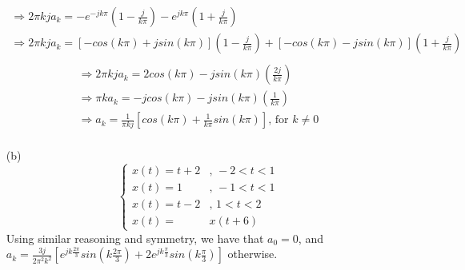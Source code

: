 \documentclass{article}
\begin{document}
\begin{enumerate}
\begin{equation*}
\begin{array}{l}
                    \Rightarrow 2\pi kja_{k} = -e^{-jk\pi}(1-\frac{j}{k\pi})-e^{jk\pi}(1+\frac{j}{k\pi}) \\
                    \Rightarrow 2\pi kja_{k} = [-cos(k\pi)+jsin(k\pi)](1-\frac{j}{k\pi})+[-cos(k\pi)-jsin(k\pi)](1+\frac{j}{k\pi}) \\
                \end{array}
            \end{equation*}
            \begin{equation*}
                \begin{array}{l}
                    \Rightarrow 2\pi kja_{k} = 2cos(k\pi)-jsin(k\pi)(\frac{2j}{k\pi}) \\
                     \Rightarrow \pi ka_{k} = -jcos(k\pi)-jsin(k\pi)(\frac{1}{k\pi}) \\
                     \Rightarrow a_{k} = \frac{1}{\pi kj}[ cos(k\pi)+\frac{1}{k\pi}sin(k\pi)]\textrm{, for }k\neq 0 \\ 
                \end{array}
            \end{equation*}
            
        \item[(b)]
            \begin{equation*}
                \left\{\begin{array}{rl}
                    x(t)=t+2&\textrm{, } -2 < t < 1  \\
                    x(t)=1&\textrm{, } -1 < t < 1  \\
                    x(t)=t-2&\textrm{, } 1 < t < 2  \\
                    x(t)= &x(t+6)
                \end{array}\right.
            \end{equation*}
            Using similar reasoning and symmetry, we have that $a_{0}=0$, and $a_{k} = \frac{3j}{2{\pi}^2k^2}[e^{jk\frac{2\pi}{3}}sin(k\frac{2\pi}{3})+2e^{jk\frac{\pi}{3}}sin(k\frac{\pi}{3})]$ otherwise.
        \end{enumerate}
\end{document}
